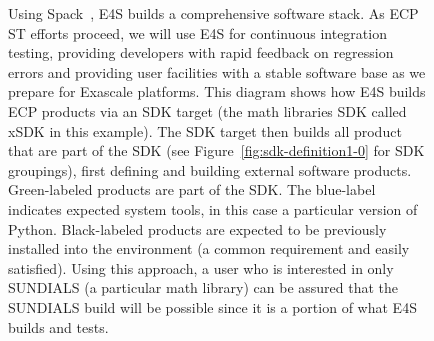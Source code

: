 \begin{figure}
		\centering
	\caption{Using Spack~\cite{gamblin+:ecp18-spack-tutorial}, E4S builds a comprehensive software stack.  As ECP ST efforts proceed, we will use E4S for continuous integration testing, providing developers with rapid feedback on regression errors and providing user facilities with a stable software base as we prepare for Exascale platforms.  This diagram shows how E4S builds ECP products via an SDK target (the math libraries SDK called xSDK in this example).  The SDK target then builds all product that are part of the SDK (see Figure~\ref{fig:sdk-definition1-0} for SDK groupings), first defining and building external software products. Green-labeled products are part of the SDK. The blue-label indicates expected system tools, in this case a particular version of Python.  Black-labeled products are expected to be previously installed into the environment (a common requirement and easily satisfied).  Using this approach, a user who is interested in only SUNDIALS (a particular math library) can be assured that the SUNDIALS build will be possible since it is a portion of what E4S builds and tests.}
	\label{fig:e4s-build-tree}
\end{figure}

